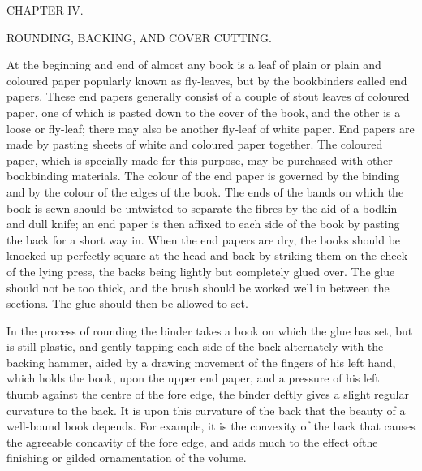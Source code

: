 \documentclass[twoside]{book}
\begin{document}
\pagebreak


\thispagestyle{empty}

\vspace*{\fill}

\begin{center}

\begin{large}CHAPTER IV.\end{large}

\begin{small}ROUNDING, BACKING, AND COVER CUTTING.\end{small}

\end{center}

\noindent
At the beginning and end of almost any book is a leaf
of plain or plain and coloured paper popularly known
as fly-leaves, but by the bookbinders called end
papers. These end papers generally consist of a
couple of stout leaves of coloured paper, one of
which is pasted down to the cover of the book, and
the other is a loose or fly-leaf; there may also be
another fly-leaf of white paper. End papers are
made by pasting sheets of white and coloured paper
together. The coloured paper, which is specially
made for this purpose, may be purchased with other
bookbinding materials. The colour of the end
paper is governed by the binding and by the colour
of the edges of the book. The ends of the bands on
which the book is sewn should be untwisted to
separate the fibres by the aid of a bodkin and dull
knife; an end paper is then affixed to each side of
the book by pasting the back for a short way in.
When the end papers are dry, the books should be
knocked up perfectly square at the head and back
by striking them on the cheek of the lying press,
the backs being lightly but completely glued
over. The glue should not be too thick, and the
brush should be worked well in between the sections.
The glue should then be allowed to set.

In the process of rounding the binder takes a
book on which the glue has set, but is still plastic,
and gently tapping each side of the back alternately
with the backing hammer, aided by a drawing movement
of the fingers of his left hand, which holds
the book, upon the upper end paper, and a pressure
\pagebreak
of his left thumb against the centre of the fore
edge, the binder deftly gives a slight regular
curvature to the back. It is upon this curvature of the
back that the beauty of a well-bound book depends.
For example, it is the convexity of the back that
causes the agreeable concavity of the fore edge, and
adds much to the effect ofthe finishing or gilded
ornamentation of the volume.
\end{document}
